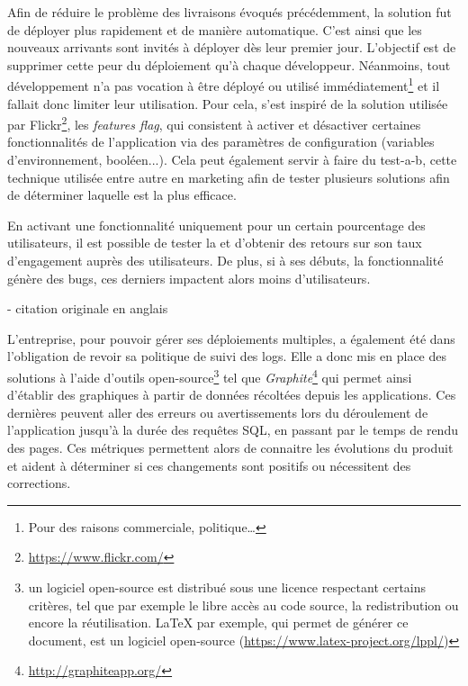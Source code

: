 Afin de réduire le problème des livraisons évoqués précédemment, la solution fut de déployer plus rapidement et de manière automatique. C'est ainsi que les nouveaux arrivants sont invités à déployer dès leur premier jour. L'objectif est de supprimer cette peur du déploiement qu'à chaque développeur. Néanmoins, tout développement n'a pas vocation à être déployé ou utilisé immédiatement\footnote{Pour des raisons commerciale, politique\ldots} et il fallait donc limiter leur utilisation. Pour cela, \etsy{} s'est inspiré de la solution utilisée par Flickr\footnote{\url{https://www.flickr.com/}}, les \emph{features flag}, qui consistent à activer et désactiver certaines fonctionnalités de l'application via des paramètres de configuration (variables d'environnement, booléen...). Cela peut également servir à faire du \gls{test-a-b}, cette technique utilisée entre autre en marketing afin de tester plusieurs solutions afin de déterminer laquelle est la plus efficace. 

\clearpage

En activant une fonctionnalité uniquement pour un certain pourcentage des utilisateurs, il est possible de tester la et d'obtenir des retours sur son taux d'engagement auprès des utilisateurs. De plus, si à ses débuts, la fonctionnalité génère des bugs, ces derniers impactent alors moins d'utilisateurs.

\epigraph{}{ \cite{etsyLogs} - citation originale en anglais}

L'entreprise, pour pouvoir gérer ses déploiements multiples, a également été dans l'obligation de revoir sa politique de suivi des logs. Elle a donc mis en place des solutions à l'aide d'outils open-source\footnote{un logiciel open-source est distribué sous une licence respectant certains critères, tel que par exemple le libre accès au code source, la redistribution ou encore la réutilisation. \LaTeX{} par exemple, qui permet de générer ce document, est un logiciel open-source (\url{https://www.latex-project.org/lppl/})} tel que \emph{Graphite}\footnote{\url{http://graphiteapp.org/}} qui permet ainsi d'établir des graphiques à partir de données récoltées depuis les applications. Ces dernières peuvent aller des erreurs ou avertissements lors du déroulement de l'application jusqu'à la durée des requêtes \gls{SQL}, en passant par le temps de rendu des pages. Ces métriques permettent alors de connaitre les évolutions du produit et aident à déterminer si ces changements sont positifs ou nécessitent des corrections.

